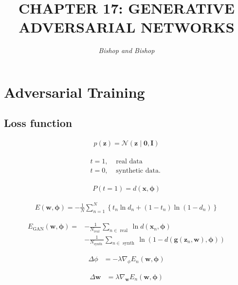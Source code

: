 \documentclass{article}
\title{\LARGE\scshape\MakeUppercase{Chapter 17: Generative Adversarial Networks}}
\author{\textit{Bishop and Bishop}}
\date{}
\begin{document}
\maketitle

\section{Adversarial Training}
\subsection{Loss function}

\begin{align*}
p(\mathbf{z})=\mathcal{N}(\mathbf{z} \mid \mathbf{0}, \mathbf{I}) 
\tag{17.1}
\end{align*}

\begin{align*}
\begin{array}{ll}
t=1, & \text{ real data }  \tag{17.2}\\
t=0, & \text{ synthetic data. }
\end{array}
\tag{17.3}
\end{align*}

\begin{align*}
P(t=1)=d(\mathbf{x}, \boldsymbol{\phi}) 
\tag{17.4}
\end{align*}

\begin{align*}
E(\mathbf{w}, \boldsymbol{\phi})=-\frac{1}{N} \sum_{n=1}^{N}\left\{t_{n} \ln d_{n}+\left(1-t_{n}\right) \ln \left(1-d_{n}\right)\right\} 
\tag{17.5}
\end{align*}

\begin{align*}
E_{\mathrm{GAN}}(\mathbf{w}, \boldsymbol{\phi})= & -\frac{1}{N_{\text{real }}} \sum_{n \in \text{ real }} \ln d\left(\mathbf{x}_{n}, \boldsymbol{\phi}\right) \\
& -\frac{1}{N_{\text{synth }}} \sum_{n \in \text{ synth }} \ln \left(1-d\left(\mathbf{g}\left(\mathbf{z}_{n}, \mathbf{w}\right), \boldsymbol{\phi}\right)\right)
\tag{17.6}
\end{align*}

\begin{align*}
\Delta \phi & =-\lambda \nabla_{\phi} E_{n}(\mathbf{w}, \boldsymbol{\phi})  
\tag{17.7}
\end{align*}

\begin{align*}
\Delta \mathbf{w} & =\lambda \nabla_{\mathbf{w}} E_{n}(\mathbf{w}, \boldsymbol{\phi})
\tag{17.8}
\end{align*}
\end{document}

